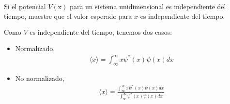 \begin{problema}
    Si el potencial $V(\mathrm{x})$ para un sistema unidimensional es independiente del tiempo, muestre que el valor esperado para $x$ es independiente del tiempo.
    \begin{sol}
        Como $V$ es independiente del tiempo, tenemos dos casos: 
        \begin{itemize}
            \item Normalizado,
            \begin{align*}
                \langle x\rangle = \int_{\infty}^\infty x\psi^*(x)\psi(x)dx
            \end{align*}
            \item No normalizado,
            \begin{align*}
                 \langle x\rangle = \frac{\int_{\infty}^\infty x\psi^*(x)\psi(x)dx}{\int_{\infty}^\infty \psi^*(x)\psi(x)dx}
            \end{align*}
        \end{itemize}
    \end{sol}
\end{problema}


